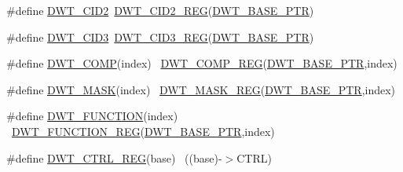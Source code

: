 \begin{DoxyCompactItemize}
\item 
\#define \hyperlink{group___d_w_t___register___accessor___macros_ga3ad9ab1e6664d6ff6c2e65597dc0746a}{D\+W\+T\+\_\+\+C\+I\+D2}~\hyperlink{group___d_w_t___register___accessor___macros_gab6a7a7788e8fdbbe47ac13383064a1e8}{D\+W\+T\+\_\+\+C\+I\+D2\+\_\+\+R\+EG}(\hyperlink{group___d_w_t___peripheral_ga3b46dfb2ea7946c6938028d879c82cb1}{D\+W\+T\+\_\+\+B\+A\+S\+E\+\_\+\+P\+TR})
\item 
\#define \hyperlink{group___d_w_t___register___accessor___macros_gadd1089d7c9184482d47e6ddaa124c47c}{D\+W\+T\+\_\+\+C\+I\+D3}~\hyperlink{group___d_w_t___register___accessor___macros_ga7a29c7e2d907c373f1ffa34877e83852}{D\+W\+T\+\_\+\+C\+I\+D3\+\_\+\+R\+EG}(\hyperlink{group___d_w_t___peripheral_ga3b46dfb2ea7946c6938028d879c82cb1}{D\+W\+T\+\_\+\+B\+A\+S\+E\+\_\+\+P\+TR})
\item 
\#define \hyperlink{group___d_w_t___register___accessor___macros_ga8cd13337dbf7cec23c7f8c3621860e9e}{D\+W\+T\+\_\+\+C\+O\+MP}(index)                                                ~\hyperlink{group___d_w_t___register___accessor___macros_gad03eebac5bf5c3c3e461e156ba6e37ae}{D\+W\+T\+\_\+\+C\+O\+M\+P\+\_\+\+R\+EG}(\hyperlink{group___d_w_t___peripheral_ga3b46dfb2ea7946c6938028d879c82cb1}{D\+W\+T\+\_\+\+B\+A\+S\+E\+\_\+\+P\+TR},index)
\item 
\#define \hyperlink{group___d_w_t___register___accessor___macros_ga293560983db73f0a6acead2a597fe349}{D\+W\+T\+\_\+\+M\+A\+SK}(index)                                                ~\hyperlink{group___d_w_t___register___accessor___macros_ga16461875f56f3b91ee27a53a9f4dbc78}{D\+W\+T\+\_\+\+M\+A\+S\+K\+\_\+\+R\+EG}(\hyperlink{group___d_w_t___peripheral_ga3b46dfb2ea7946c6938028d879c82cb1}{D\+W\+T\+\_\+\+B\+A\+S\+E\+\_\+\+P\+TR},index)
\item 
\#define \hyperlink{group___d_w_t___register___accessor___macros_ga6fc901c7f1391678b4058358fd39b877}{D\+W\+T\+\_\+\+F\+U\+N\+C\+T\+I\+ON}(index)                                        ~\hyperlink{group___d_w_t___register___accessor___macros_gaedc0f311fdf85789a988b58375481265}{D\+W\+T\+\_\+\+F\+U\+N\+C\+T\+I\+O\+N\+\_\+\+R\+EG}(\hyperlink{group___d_w_t___peripheral_ga3b46dfb2ea7946c6938028d879c82cb1}{D\+W\+T\+\_\+\+B\+A\+S\+E\+\_\+\+P\+TR},index)
\item 
\#define \hyperlink{group___d_w_t___register___accessor___macros_ga805e8330d1aa986d534abe1eed2614df}{D\+W\+T\+\_\+\+C\+T\+R\+L\+\_\+\+R\+EG}(base)                                          ~((base)-\/$>$C\+T\+RL)
\item 

\end{DoxyCompactItemize}

